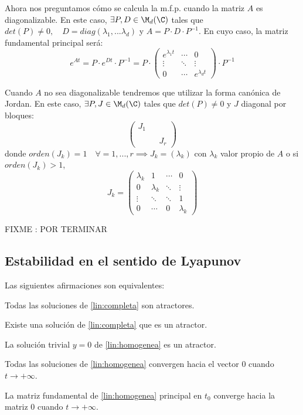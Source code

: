 Ahora nos preguntamos cómo se calcula la m.f.p. cuando la matriz $A$ es diagonalizable. En este caso, $\exists P, D \in \M_d(\C)$ tales que $det(P)\neq 0, \quad D=diag(\lambda_1,...\lambda_d)$ y $A=P\cdot D \cdot P^{-1}$. En cuyo caso, la matriz fundamental principal será:
$$e^{At}=P\cdot e^{Dt}\cdot P^{-1}=P \cdot  \begin{pmatrix}e^{\lambda_1 t} & \cdots & 0 \\ \vdots & \ddots & \vdots \\0 & \cdots & e^{\lambda_d t}\end{pmatrix} \cdot P^{-1}$$


Cuando $A$ no sea diagonalizable tendremos que utilizar la forma canónica de Jordan. En este caso, $\exists P,J\in \M_d(\C)$ tales que $det(P) \neq 0 $ y $J$ diagonal por bloques:
$$\begin{pmatrix}J_1 & & \\
 & & \\
 & & J_r \end{pmatrix}$$
 donde $orden(J_k)=1 \quad \forall =1,...,r \implies J_k=(\lambda_k)$ con $\lambda_k$ valor propio de $A$ o si $orden(J_k)>1$,
 $$J_k=
 \begin{pmatrix}
 \lambda_k & 1  &\cdots & 0 \\
  0 & \lambda_k & \ddots & \vdots \\
  \vdots & \ddots & \ddots & 1 \\
  0 & \cdots & 0 & \lambda_k
\end{pmatrix}$$

FIXME : POR TERMINAR
\subsection{Estabilidad en el sentido de Lyapunov}

\begin{nprop}
Las siguientes afirmaciones son equivalentes:
\begin{nlist}
\item Todas las soluciones de \eqref{lin:completa} son atractores.
\item Existe una solución de \eqref{lin:completa} que es un atractor.
\item La solución trivial $y = 0$ de \eqref{lin:homogenea} es un atractor.
\item Todas las soluciones de \eqref{lin:homogenea} convergen hacia el vector 0 cuando $t \to +\infty$.
\item La matriz fundamental de \eqref{lin:homogenea} principal en $t_0$ converge hacia la matriz 0 cuando $t \to +\infty$.
\end{nlist}
\end{nprop}

